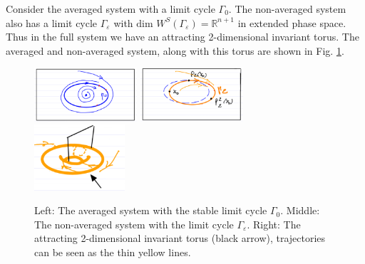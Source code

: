 \begin{ex}
	Consider the averaged system with a limit cycle $\Gamma_0$. The non-averaged system also has a limit cycle $\Gamma_\varepsilon$ with $ \textrm{dim }W^{S}(\Gamma_\varepsilon) =\mathbb{R}^{n+1} $ in extended phase space. Thus in the full system we have an attracting 2-dimensional invariant torus. The averaged and non-averaged system, along with this torus are shown in Fig. \ref{fig:avg_ex_3}.
	\begin{figure}[h!]
		\centering
		\includegraphics[width=0.34\textwidth]{figures/ch5/8avg_ex_4a.png}
		\includegraphics[width=0.34\textwidth]{figures/ch5/9avg_ex_4b.png}
		\includegraphics[width=0.3\textwidth]{figures/ch5/10avg_ex_4c.png}
		\caption{Left: The averaged system with the stable limit cycle $\Gamma_0$. Middle: The non-averaged system with the limit cycle $\Gamma_{\varepsilon}$. Right: The attracting 2-dimensional invariant torus (black arrow), trajectories can be seen as the thin yellow lines.}
		\label{fig:avg_ex_3}
	\end{figure}
	
\end{ex}

